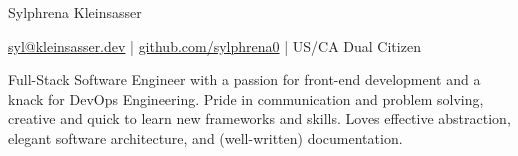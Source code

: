 \documentclass[11pt]{article}       %
\begin{document}
\centerline{\Huge Sylphrena Kleinsasser}

\vspace{5pt}

\centerline{\href{mailto:syl@kleinsasser.dev}{syl@kleinsasser.dev} | \href{https://github.com/sylphrena0}{github.com/sylphrena0} | US/CA Dual Citizen} %
\vspace{4pt}

Full-Stack Software Engineer with a passion for front-end development and a knack for DevOps Engineering. Pride in communication and problem solving, creative and quick to learn new frameworks and skills. Loves effective abstraction, elegant software architecture, and (well-written) documentation.
















\vspace{-6.5pt}

\end{document}

